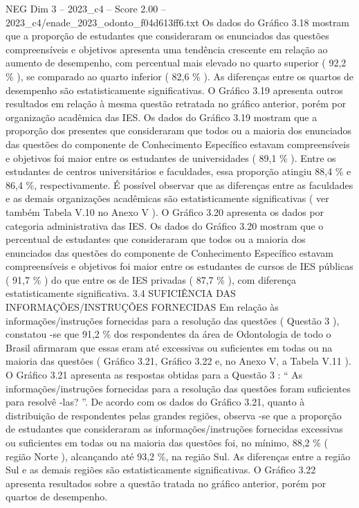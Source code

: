 \begin{textsample}{NEG Dim 3 – 2023\_c4 – Score 2.00 – 2023\_c4/enade\_2023\_odonto\_f04d613ff6.txt}
Os dados do Gráfico 3.18 mostram que a proporção de estudantes que consideraram os enunciados das questões compreensíveis e objetivos apresenta uma tendência crescente em relação ao aumento de desempenho, com percentual mais elevado no quarto superior ( 92,2 \% ), se comparado ao quarto inferior ( 82,6 \% ).
As diferenças entre os quartos de desempenho são estatisticamente significativas.
O Gráfico 3.19 apresenta outros resultados em relação à mesma questão retratada no gráfico anterior, porém por organização acadêmica das IES.
Os dados do Gráfico 3.19 mostram que a proporção dos presentes que consideraram que todos ou a maioria dos enunciados das questões do componente de Conhecimento Específico estavam compreensíveis e objetivos foi maior entre os estudantes de universidades ( 89,1 \% ).
Entre os estudantes de centros universitários e faculdades, essa proporção atingiu 88,4 \% e 86,4 \%, respectivamente.
É possível observar que as diferenças entre as faculdades e as demais organizações acadêmicas são estatisticamente significativas ( ver também Tabela V.10 no Anexo V ).
O Gráfico 3.20 apresenta os dados por categoria administrativa das IES.
Os dados do Gráfico 3.20 mostram que o percentual de estudantes que consideraram que todos ou a maioria dos enunciados das questões do componente de Conhecimento Específico estavam compreensíveis e objetivos foi maior entre os estudantes de cursos de IES públicas ( 91,7 \% ) do que entre os de IES privadas ( 87,7 \% ), com diferença estatisticamente significativa. 3.4 SUFICIÊNCIA DAS INFORMAÇÕES/INSTRUÇÕES FORNECIDAS Em relação às informações/instruções fornecidas para a resolução das questões ( Questão 3 ), constatou -se que 91,2 \% dos respondentes da área de Odontologia de todo o Brasil afirmaram que essas eram até excessivas ou suficientes em todas ou na maioria das questões ( Gráfico 3.21, Gráfico 3.22 e, no Anexo V, a Tabela V.11 ).
O Gráfico 3.21 apresenta as respostas obtidas para a Questão 3 : “ As informações/instruções fornecidas para a resolução das questões foram suficientes para resolvê -las? ”.
De acordo com os dados do Gráfico 3.21, quanto à distribuição de respondentes pelas grandes regiões, observa -se que a proporção de estudantes que consideraram as informações/instruções fornecidas excessivas ou suficientes em todas ou na maioria das questões foi, no mínimo, 88,2 \% ( região Norte ), alcançando até 93,2 \%, na região Sul.
As diferenças entre a região Sul e as demais regiões são estatisticamente significativas.
O Gráfico 3.22 apresenta resultados sobre a questão tratada no gráfico anterior, porém por quartos de desempenho.

\end{textsample}
